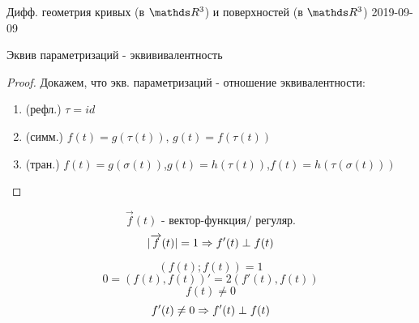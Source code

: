 \documentclass[main]{subfiles}
\begin{document}
\begin{lect}{Дифф. геометрия кривых (в $\R^3$) и поверхностей (в $\R^3$) 2019-09-09}
    \begin{lemma}
    	Эквив параметризаций - эквививалентность
    \end{lemma}

    \begin{proof}
    	Докажем, что экв. параметризаций - отношение эквивалентности:
        \begin{enumerate}
            \item (рефл.) $\tau=id$
            \item (симм.) $f(t)=g(\tau(t))$, \q $g(t)=f(\tau(t))$
            \item (тран.) $f(t)=g(\sigma(t))$,\q $g(t)=h(\tau(t))$,\q $f(t)=h(\tau(\sigma(t)))$
        \end{enumerate}
    \end{proof}

    \begin{Lemma}
    	\[\overrightarrow{f}(t) \text{ - вектор-функция/ регуляр.}\]
    	\[|\overrightarrow{f}(t)| = 1 \Rightarrow f'(t) \perp f(t)\]
    \end{Lemma}

    \begin{Proof}
    	\[(f(t); f(t)) = 1\]
    	\[0 = (f(t), f(t))' = 2(f'(t), f(t))\]
    	\[f(t) \neq 0\]
    	\[f'(t) \neq 0 \Rightarrow f'(t) \perp f(t)\]
    \end{Proof}
  \end{lect}
\end{document}
